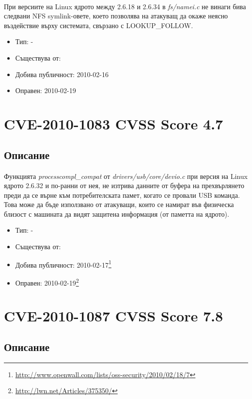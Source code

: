 \documentclass[a4paper,12pt,leqno]{article}
\begin{document}
\paragraph{}
При версиите на Linux ядрото между 2.6.18 и 2.6.34 в \textit{fs/namei.c} не винаги бива 
следвани NFS symlink-овете, което позволява на атакуващ да 
окаже неясно въздействие върху системата, свързано с LOOKUP\_FOLLOW.

\begin{itemize}
    \item Тип: -
    \item Съществува от:
  	\item Добива публичност: 2010-02-16
    \item Оправен: 2010-02-19
\end{itemize}

\section{CVE-2010-1083 CVSS Score 4.7}
\subsection{Описание}
\paragraph{}
Функцията \textit{processcompl\_compat} от \textit{drivers/usb/core/devio.c} при версия на Linux 
ядрото 2.6.32 и по-ранни от нея, не изтрива данните от буфера на 
прехвърлянето преди да се върне към потребителската памет, когато се 
провали USB команда. Това може да бъде използвано от атакуващи, които се 
намират във физическа близост с машината да видят защитена информация 
(от паметта на ядрото).


\begin{itemize}
    \item Тип: -
    \item Съществува от:
  	\item Добива публичност: 2010-02-17\footnote{\url{http://www.openwall.com/lists/oss-security/2010/02/18/7}}
    \item Оправен: 2010-02-19\footnote{\url{http://lwn.net/Articles/375350/}}
\end{itemize}


\section{CVE-2010-1087 CVSS Score 7.8}
\subsection{Описание}
\end{document}
